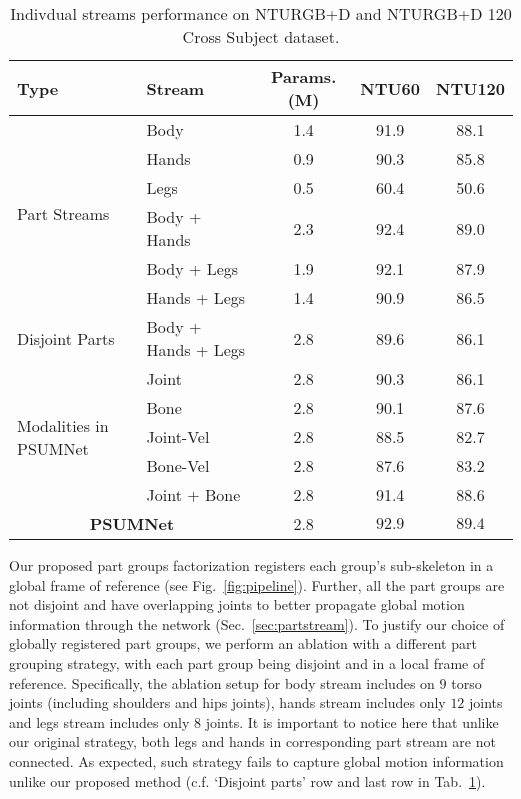 \documentclass[runningheads]{llncs}
\begin{document}
\begin{table}[!t]
  \resizebox{0.7\linewidth}{!} 
    {\begin{tabular}{l|l|c|cc}
    \toprule
    Type & Stream & Params. (M) & NTU60 & NTU120\\
    \midrule
    \multirow{6}{3em}{Part Streams} 
    & Body & 1.4 & 91.9 & 88.1\\
    & Hands & 0.9 & 90.3 & 85.8\\
    & Legs & 0.5 & 60.4 & 50.6\\
    & Body + Hands & 2.3 & 92.4 & 89.0\\
    & Body + Legs & 1.9 & 92.1 & 87.9\\
    & Hands + Legs & 1.4 & 90.9 & 86.5\\
    \midrule
    Disjoint Parts & Body + Hands + Legs 
    & 2.8 & 89.6 & 86.1\\
    \midrule
    \multirow{5}{3em}{Modalities in PSUMNet} 
    & Joint & 2.8 & 90.3 & 86.1\\
    & Bone & 2.8 & 90.1 & 87.6\\
    & Joint-Vel & 2.8 & 88.5 & 82.7\\
    & Bone-Vel & 2.8 & 87.6 & 83.2\\
    & Joint + Bone & 2.8 & 91.4 & 88.6\\
    \midrule
    \multicolumn{2}{c|}{\textbf{PSUMNet}} & 2.8 & $\mathbf{92.9}$ & $\mathbf{89.4}$\\
  \bottomrule
 
\end{tabular}
}
 \caption{\label{tab:ablation_table} Indivdual streams performance on NTURGB+D and NTURGB+D 120 Cross Subject dataset.}
  
\end{table}



Our proposed part groups factorization registers each group's sub-skeleton in a global frame of reference (see Fig.~\ref{fig:pipeline}). Further, all the part groups are not disjoint and have overlapping joints to better propagate global motion information through the network (Sec.~\ref{sec:partstream}). To justify our choice of globally registered part groups, we perform an ablation with a different part grouping strategy, with each part group being disjoint and in a local frame of reference. Specifically, the ablation setup for body stream includes on $9$ torso joints (including shoulders and hips joints), hands stream includes only $12$ joints and legs stream includes only $8$ joints. It is important to notice here that unlike our original strategy, both legs and hands in corresponding part stream are not connected. As expected, such strategy fails to capture global motion information unlike our proposed method (c.f. `Disjoint parts' row and last row in Tab.~\ref{tab:ablation_table}).
\end{document}
